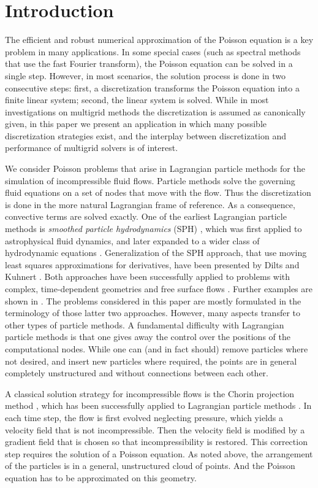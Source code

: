 \documentclass[reqno]{amsart}
\theoremstyle{plain}
\theoremstyle{definition}
\theoremstyle{remark}
\begin{document}
\section{Introduction}
The efficient and robust numerical approximation of the Poisson equation is a key
problem in many applications. In some special cases (such as spectral methods that
use the fast Fourier transform), the Poisson equation can be solved in a single
step. However, in most scenarios, the solution process is done in two consecutive steps:
first, a discretization transforms the Poisson equation into a finite linear system;
second, the linear system is solved. While in most investigations on multigrid methods
the discretization is assumed as canonically given, in this paper we present an
application in which many possible discretization strategies exist, and the interplay
between discretization and performance of multigrid solvers is of interest.

We consider Poisson problems that arise in Lagrangian particle methods for the
simulation of incompressible fluid flows. Particle methods solve the governing fluid
equations on a set of nodes that move with the flow. Thus the discretization is done
in the more natural Lagrangian frame of reference. As a consequence, convective terms
are solved exactly. One of the earliest Lagrangian particle methods
is \emph{smoothed particle hydrodynamics} (SPH) \cite{Lucy1977,GingoldMonaghan1977},
which was first applied to astrophysical fluid dynamics, and later expanded to a
wider class of hydrodynamic equations \cite{Monaghan1988,Monaghan1992}.
Generalization of the SPH approach, that use moving least squares approximations for
derivatives, have been presented by Dilts \cite{Dilts1999}
and Kuhnert \cite{KuhnertDiss1999}. Both approaches have been successfully applied
to problems with complex, time-dependent geometries \cite{KuhnertTiwari2002} and
free surface flows \cite{KuhnertTiwariPasadena2003}. Further examples are shown
in \cite{SeiboldMeshfree2007}. The problems considered in this paper are mostly
formulated in the terminology of those latter two approaches. However, many aspects
transfer to other types of particle methods.
A fundamental difficulty with Lagrangian particle methods is that one gives away
the control over the positions of the computational nodes. While one can (and in
fact should) remove particles where not desired, and insert new particles where
required, the points are in general completely unstructured and without connections
between each other.

A classical solution strategy for incompressible flows is the Chorin projection
method \cite{Chorin1968}, which has been successfully applied to Lagrangian particle
methods \cite{CumminsRudman1998,CumminsRudman1999}.
In each time step, the flow is first evolved neglecting
pressure, which yields a velocity field that is not incompressible. Then the
velocity field is modified by a gradient field that is chosen so that
incompressibility is restored. This correction step requires the solution of a Poisson
equation. As noted above, the arrangement of the particles is in a general,
unstructured cloud of points. And the Poisson equation has to be approximated on
this geometry.
\end{document}
